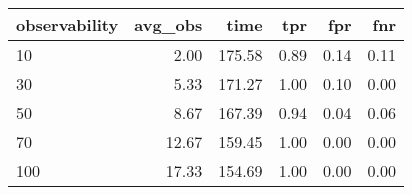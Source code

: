\begin{tabular}{lrrrrr}
\toprule
observability & avg_obs & time & tpr & fpr & fnr \\
\midrule
10 & 2.00 & 175.58 & 0.89 & 0.14 & 0.11 \\
30 & 5.33 & 171.27 & 1.00 & 0.10 & 0.00 \\
50 & 8.67 & 167.39 & 0.94 & 0.04 & 0.06 \\
70 & 12.67 & 159.45 & 1.00 & 0.00 & 0.00 \\
100 & 17.33 & 154.69 & 1.00 & 0.00 & 0.00 \\
\bottomrule
\end{tabular}
